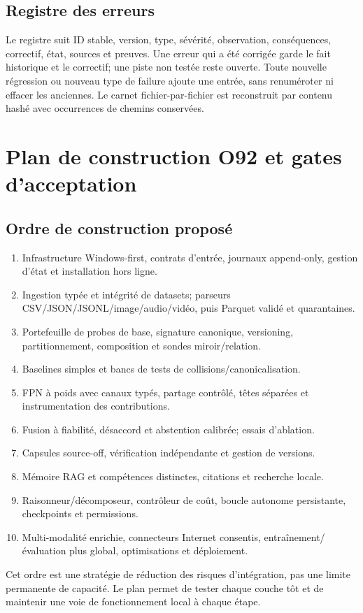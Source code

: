 \documentclass[11pt,a4paper]{report}
\begin{document}
\section{Registre des erreurs}
Le registre  suit ID stable, version, type, sévérité, observation, conséquences, correctif, état, sources et preuves. Une erreur qui a été corrigée garde le fait historique et le correctif; une piste non testée reste ouverte. Toute nouvelle régression ou nouveau type de failure ajoute une entrée, sans renuméroter ni effacer les anciennes. Le carnet fichier-par-fichier est reconstruit par contenu hashé avec occurrences de chemins conservées.

\chapter{Plan de construction O92 et gates d'acceptation}
\section{Ordre de construction proposé}
\begin{enumerate}[leftmargin=1.6em]
\item Infrastructure Windows-first, contrats d'entrée, journaux append-only, gestion d'état et installation hors ligne.
\item Ingestion typée et intégrité de datasets; parseurs CSV/JSON/JSONL/image/audio/vidéo, puis Parquet validé et quarantaines.
\item Portefeuille de probes de base, signature canonique, versioning, partitionnement, composition et sondes miroir/relation.
\item Baselines simples et bancs de tests de collisions/canonicalisation.
\item FPN à poids avec canaux typés, partage contrôlé, têtes séparées et instrumentation des contributions.
\item Fusion à fiabilité, désaccord et abstention calibrée; essais d'ablation.
\item Capsules source-off, vérification indépendante et gestion de versions.
\item Mémoire RAG et compétences distinctes, citations et recherche locale.
\item Raisonneur/décomposeur, contrôleur de coût, boucle autonome persistante, checkpoints et permissions.
\item Multi-modalité enrichie, connecteurs Internet consentis, entraînement/évaluation plus global, optimisations et déploiement.
\end{enumerate}
Cet ordre est une stratégie de réduction des risques d'intégration, pas une limite permanente de capacité. Le plan permet de tester chaque couche tôt et de maintenir une voie de fonctionnement local à chaque étape.
\end{document}
